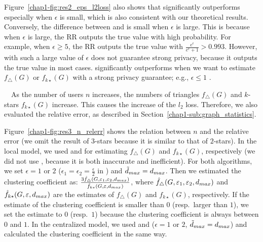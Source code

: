 Figure~\ref{chap1-fig:res2_eps_l2loss} also shows that 
 significantly outperforms  especially when $\epsilon$ is small, which is also consistent with our theoretical results. 
Conversely, the difference between  and  is small when $\epsilon$ is large. 
This is because when $\epsilon$ is large, the RR outputs the true value with high probability. 
For example, when 
$\epsilon \geq 5$, 
the RR outputs the true value with 
$\frac{e^\epsilon}{e^\epsilon+1} > 0.993$. 
However,  with 
such a large value of $\epsilon$ 
does not guarantee strong privacy, because it outputs the true value in most cases. 
 significantly outperforms  
when we want to estimate $f_\triangle(G)$ or $f_{k\star}(G)$ 
with a strong privacy guarantee; e.g., $\epsilon \leq 1$ \cite{DP_Li}. 

\smallskip
{}~~As the number of users $n$ increases, the numbers of triangles $f_\triangle(G)$ and $k$-stars $f_{k\star}(G)$ increase. 
This causes the increase of the $l_2$ loss. 
Therefore, we also evaluated the relative error, as described in Section~\ref{chap1-sub:graph_statistics}. 

Figure~\ref{chap1-fig:res3_n_relerr} shows the relation between $n$ and the relative error 
(we omit the result of $3$-stars because it is similar to that of $2$-stars). 
In the local model, we used  and  for estimating 
$f_\triangle(G)$ 
and 
$f_{k\star}(G)$, 
respectively 
(we did not use , because it is both inaccurate and inefficient). 
For both algorithms, we set $\epsilon = 1$ or $2$ 
($\epsilon_1 = \epsilon_2 = \frac{\epsilon}{2}$ in ) and $\tilde{d}_{max} = d_{max}$. 
Then we estimated the clustering coefficient as: $\frac{3\hat{f}_{\triangle}(G, \varepsilon_1, \varepsilon_2, d_{max})}{\hat{f}_{k\star}(G, \varepsilon, d_{max})}$, where 
$\hat{f}_{\triangle}(G, \varepsilon_1, \varepsilon_2, d_{max})$ and 
$\hat{f}_{k\star}(G, \varepsilon, d_{max})$ are the estimates of $f_\triangle(G)$ and $f_{k\star}(G)$, respectively. 
If the estimate of the clustering coefficient is smaller than $0$ (resp.~larger than $1$), we set the estimate to $0$ (resp.~$1$) because the clustering coefficient is always between $0$ and $1$. 
In the centralized model, we used  and  ($\epsilon=1$ or $2$, $\tilde{d}_{max} = d_{max}$) and calculated the clustering coefficient in the same way. 

